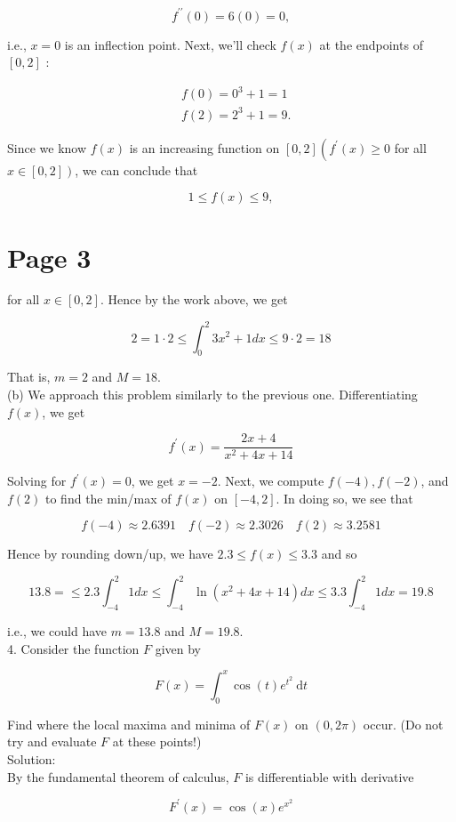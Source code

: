 \documentclass[10pt]{article}
\begin{document}
$$
f^{\prime \prime}(0)=6(0)=0,
$$

i.e., $x=0$ is an inflection point. Next, we'll check $f(x)$ at the endpoints of $[0,2]$ :

$$
\begin{aligned}
& f(0)=0^{3}+1=1 \\
& f(2)=2^{3}+1=9 .
\end{aligned}
$$

Since we know $f(x)$ is an increasing function on $[0,2]\left(f^{\prime}(x) \geq 0\right.$ for all $\left.x \in[0,2]\right)$, we can conclude that

$$
1 \leq f(x) \leq 9,
$$

\section*{Page 3}
for all $x \in[0,2]$. Hence by the work above, we get

$$
2=1 \cdot 2 \leq \int_{0}^{2} 3 x^{2}+1 d x \leq 9 \cdot 2=18
$$

That is, $m=2$ and $M=18$.\\
(b) We approach this problem similarly to the previous one. Differentiating $f(x)$, we get

$$
f^{\prime}(x)=\frac{2 x+4}{x^{2}+4 x+14}
$$

Solving for $f^{\prime}(x)=0$, we get $x=-2$. Next, we compute $f(-4), f(-2)$, and $f(2)$ to find the min/max of $f(x)$ on $[-4,2]$. In doing so, we see that

$$
f(-4) \approx 2.6391 \quad f(-2) \approx 2.3026 \quad f(2) \approx 3.2581
$$

Hence by rounding down/up, we have $2.3 \leq f(x) \leq 3.3$ and so

$$
13.8=\leq 2.3 \int_{-4}^{2} 1 d x \leq \int_{-4}^{2} \ln \left(x^{2}+4 x+14\right) d x \leq 3.3 \int_{-4}^{2} 1 d x=19.8
$$

i.e., we could have $m=13.8$ and $M=19.8$.\\
4. Consider the function $F$ given by

$$
F(x)=\int_{0}^{x} \cos (t) e^{t^{2}} \mathrm{~d} t
$$

Find where the local maxima and minima of $F(x)$ on $(0,2 \pi)$ occur. (Do not try and evaluate $F$ at these points!)\\
Solution:\\
By the fundamental theorem of calculus, $F$ is differentiable with derivative

$$
F^{\prime}(x)=\cos (x) e^{x^{2}}
$$
\end{document}
